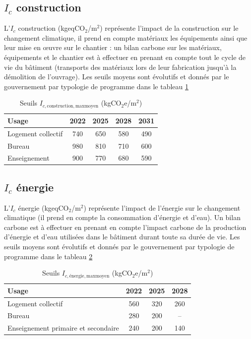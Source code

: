 \subsection*{$I_c$ construction}
L'$I_c$ construction (kgeqCO$_2$/m$^2$) représente l'impact de la construction sur le changement climatique, il prend en compte matériaux les équipements ainsi que leur mise en œuvre sur le chantier : un bilan carbone sur les matériaux, équipements et le chantier est à effectuer en prenant en compte tout le cycle de vie du bâtiment (transports des matériaux lors de leur fabrication jusqu'à la démolition de l'ouvrage).
Les seuils moyens sont évolutifs et donnés par le gouvernement par typologie de programme dans le tableau \ref{tab:ic-construction-seuils}

\begin{table}[htbp]
\centering
\caption{Seuils $I_{c,\mathrm{construction},\mathrm{maxmoyen}}$ (kgCO$_2$e/m$^2$)}
\label{tab:ic-construction-seuils}
\begin{tabular}{l|c|c|c|c}

\textbf{Usage} & \textbf{2022} & \textbf{2025} & \textbf{2028} & \textbf{2031} \\
\hline
Logement collectif & 740 & 650 & 580 & 490 \\
Bureau & 980 & 810 & 710 & 600 \\
Enseignement & 900 & 770 & 680 & 590 \\

\end{tabular}
\end{table}

\subsection*{$I_c$ énergie}
L'$I_c$ énergie (kgeqCO$_2$/m$^2$) représente l'impact de l'énergie sur le changement climatique (il prend en compte la consommation d'énergie et d'eau). Un bilan carbone est à effectuer en prenant en compte l'impact carbone de la production d'énergie et d'eau utilisées dans le bâtiment durant toute sa durée de vie.
Les seuils moyens sont évolutifs et donnés par le gouvernement par typologie de programme dans le tableau \ref{tab:ic-energie-seuils}

\begin{table}[htbp]
\centering
\caption{Seuils $I_{c,\textrm{énergie},\mathrm{maxmoyen}}$ (kgCO$_2$e/m$^2$)}
\label{tab:ic-energie-seuils}
\begin{tabular}{l|c|c|c}

\textbf{Usage} & \textbf{2022} & \textbf{2025} & \textbf{2028} \\
\hline
Logement collectif & 560 & 320 & 260 \\
Bureau & 280 & 200 & -- \\
Enseignement primaire et secondaire & 240 & 200 & 140 \\

\end{tabular}
\end{table}

